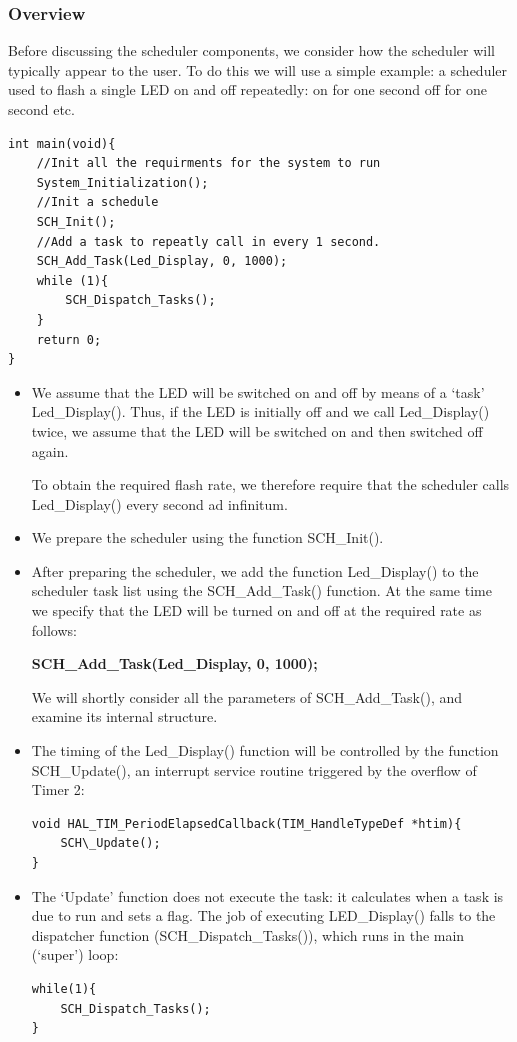 \documentclass[twoside, final]{hcmut_report}
\begin{document}
\subsubsection{Overview}
Before discussing the scheduler components, we consider how the scheduler will
typically appear to the user. To do this we will use a simple example: a scheduler used
to flash a single LED on and off repeatedly: on for one second off for one second etc.
\begin{lstlisting}[basicstyle=\small, caption=Example of how to use a scheduler]
int main(void){
    //Init all the requirments for the system to run
	System_Initialization();
	//Init a schedule
	SCH_Init();
	//Add a task to repeatly call in every 1 second.
	SCH_Add_Task(Led_Display, 0, 1000);
	while (1){
		SCH_Dispatch_Tasks();
	}
	return 0;
}
\end{lstlisting}
\begin{itemize}
    \item We assume that the LED will be switched on and off by means of a ‘task’
Led\_Display(). Thus, if the LED is initially off and we call
Led\_Display() twice, we assume that the LED will be switched on and
then switched off again. 

To obtain the required flash rate, we therefore require that the scheduler calls
Led\_Display() every second ad infinitum.

    \item We prepare the scheduler using the function SCH\_Init().
    \item After preparing the scheduler, we add the function Led\_Display() to the
scheduler task list using the SCH\_Add\_Task() function. At the same time we specify that the LED will be turned on and off at the required rate as follows:

\textbf{SCH\_Add\_Task(Led\_Display, 0, 1000);}

We will shortly consider all the parameters of SCH\_Add\_Task(), and examine its
internal structure.

\item The timing of the Led\_Display() function will be controlled by the function
SCH\_Update(), an interrupt service routine triggered by the overflow of Timer 2:
\begin{lstlisting}[basicstyle=\small, caption=Example of how to call SCH\_Update function]
void HAL_TIM_PeriodElapsedCallback(TIM_HandleTypeDef *htim){
	SCH\_Update();
}
\end{lstlisting}

\item The ‘Update’ function does not execute the task: it calculates when a task is due to run and sets a flag. The job of executing LED\_Display() falls to the dispatcher
function (SCH\_Dispatch\_Tasks()), which runs in the main (‘super’) loop:
\begin{lstlisting}
while(1){
    SCH_Dispatch_Tasks();
}
\end{lstlisting}

\end{itemize}
\end{document}
